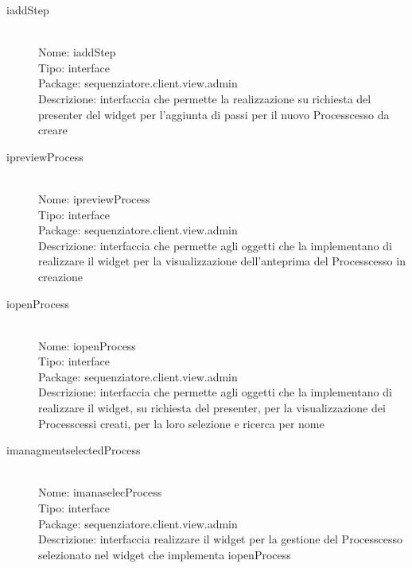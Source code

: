 \begin{description}
	\item[iaddStep] 
  	\hfill \\
  	Nome: iaddStep\\
  	Tipo: interface\\
	Package: sequenziatore.client.view.admin\\
	Descrizione: interfaccia che permette la realizzazione su richiesta del presenter del widget per l'aggiunta di passi per il nuovo Processcesso da creare
\end{description}

\begin{description}
	\item[ipreviewProcess] 
  	\hfill \\
  	Nome: ipreviewProcess\\
  	Tipo: interface\\
	Package: sequenziatore.client.view.admin\\
	Descrizione: interfaccia che permette agli oggetti che la implementano di realizzare il widget per la visualizzazione dell'anteprima del Processcesso in creazione
\end{description}

\begin{description}
	\item[iopenProcess] 
  	\hfill \\
  	Nome: iopenProcess\\
  	Tipo: interface\\
	Package: sequenziatore.client.view.admin\\
	Descrizione: interfaccia che permette agli oggetti che la implementano di realizzare il widget, su richiesta del presenter, per la visualizzazione dei Processcessi creati, per la loro selezione e ricerca per nome
\end{description}

\begin{description}
	\item[imanagmentselectedProcess] 
  	\hfill \\
  	Nome: imanaselecProcess\\
  	Tipo: interface\\
	Package: sequenziatore.client.view.admin\\
	Descrizione: interfaccia realizzare il widget per la gestione del Processcesso selezionato nel widget che implementa iopenProcess
\end{description}

